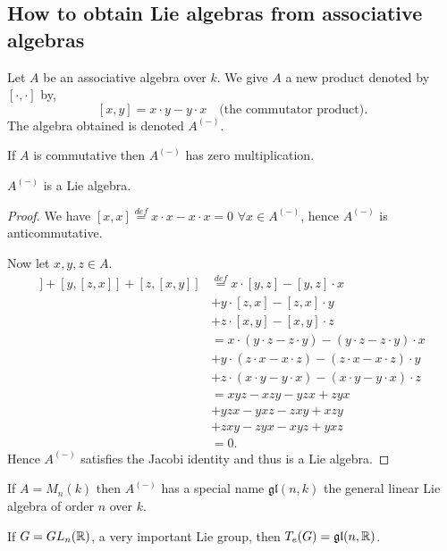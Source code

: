 \subsection{How to obtain Lie algebras from associative algebras}

Let $A$ be an associative algebra over $k$. We give $A$ a new product denoted by $[\cdot,\cdot]$ by,
\[
  [x,y] = x \cdot y - y \cdot x \quad \text{(the commutator product)}.
\]
The algebra obtained is denoted $A^{(-)}$.

\begin{remark}
  If $A$ is commutative then $A^{(-)}$ has zero multiplication.
\end{remark}

\begin{proposition}
  $A^{(-)}$ is a Lie algebra.
\end{proposition}

\begin{proof}
  We have $[x,x] \overset{def}{=} x \cdot x - x \cdot x = 0$ $\forall x \in A^{(-)}$, hence $A^{(-)}$ is anticommutative.

  Now let $x,y,z \in A$.
  \begin{align*}
    [x,[y,z]] + [y,[z,x]] + [z,[x,y]] &\overset{def}{=} x \cdot [y,z] - [y,z] \cdot x\\
    &+ y \cdot [z,x] - [z,x] \cdot y\\
    &+ z \cdot [x,y] - [x,y] \cdot z\\
    &= x \cdot (y \cdot z - z \cdot y) - (y \cdot z - z \cdot y) \cdot x\\
    &+ y \cdot (z \cdot x - x \cdot z) - (z \cdot x - x \cdot z) \cdot y\\
    &+ z \cdot (x \cdot y - y \cdot x) - (x \cdot y - y \cdot x) \cdot z\\
    &= xyz - xzy - yzx + zyx\\
    &+ yzx - yxz - zxy + xzy\\
    &+ zxy - zyx - xyz + yxz\\
    &= 0.
  \end{align*}
  Hence $A^{(-)}$ satisfies the Jacobi identity and thus is a Lie algebra.
\end{proof}

If $A = M_n(k)$ then $A^{(-)}$ has a special name $\mathfrak{gl}(n, k)$ the general linear Lie algebra of order $n$ over $k$.

\begin{remark}
  If $G=GL_n(\mathbb{R})$, a very important Lie group, then $T_e(G) = \mathfrak{gl}(n, \mathbb{R})$.
\end{remark}

